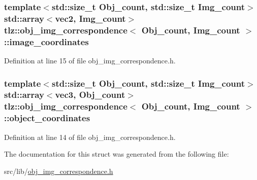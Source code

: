 \subsubsection[{\texorpdfstring{image\+\_\+coordinates}{image_coordinates}}]{\setlength{\rightskip}{0pt plus 5cm}template$<$std\+::size\+\_\+t Obj\+\_\+count, std\+::size\+\_\+t Img\+\_\+count$>$ std\+::array$<${\bf vec2}, Img\+\_\+count$>$ {\bf tlz\+::obj\+\_\+img\+\_\+correspondence}$<$ Obj\+\_\+count, Img\+\_\+count $>$\+::image\+\_\+coordinates}\hypertarget{structtlz_1_1obj__img__correspondence_a81b42710f3354d175e1f38b36c0e83ef}{}\label{structtlz_1_1obj__img__correspondence_a81b42710f3354d175e1f38b36c0e83ef}


Definition at line 15 of file obj\+\_\+img\+\_\+correspondence.\+h.

\subsubsection[{\texorpdfstring{object\+\_\+coordinates}{object_coordinates}}]{\setlength{\rightskip}{0pt plus 5cm}template$<$std\+::size\+\_\+t Obj\+\_\+count, std\+::size\+\_\+t Img\+\_\+count$>$ std\+::array$<${\bf vec3}, Obj\+\_\+count$>$ {\bf tlz\+::obj\+\_\+img\+\_\+correspondence}$<$ Obj\+\_\+count, Img\+\_\+count $>$\+::object\+\_\+coordinates}\hypertarget{structtlz_1_1obj__img__correspondence_afc82702c6c8699a8d725faa2f50d4b87}{}\label{structtlz_1_1obj__img__correspondence_afc82702c6c8699a8d725faa2f50d4b87}


Definition at line 14 of file obj\+\_\+img\+\_\+correspondence.\+h.



The documentation for this struct was generated from the following file\+:\begin{DoxyCompactItemize}
\item 
src/lib/\hyperlink{obj__img__correspondence_8h}{obj\+\_\+img\+\_\+correspondence.\+h}\end{DoxyCompactItemize}

